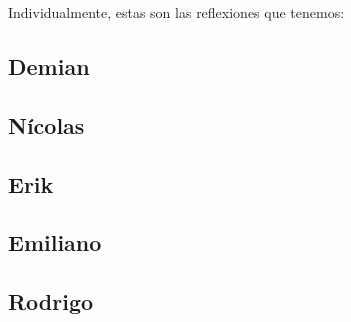 \documentclass[12pt]{article}
\begin{document}
\vspace{1cm}
Individualmente, estas son las reflexiones que tenemos:

\subsection{Demian}
\subsection{Nícolas}
\subsection{Erik}
\subsection{Emiliano}
\subsection{Rodrigo}
\end{document}
